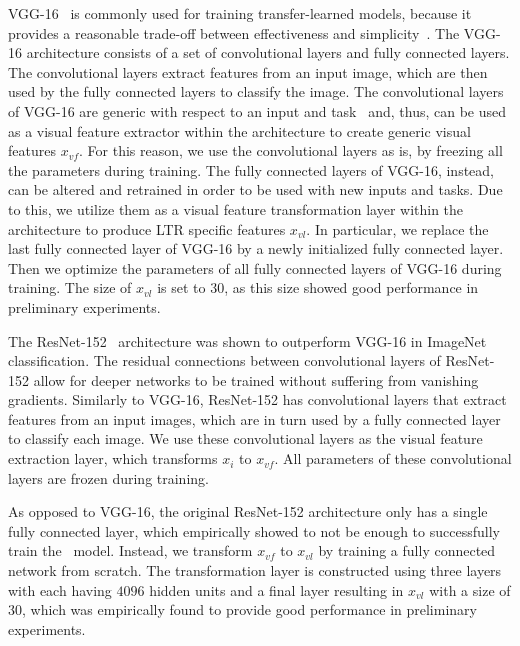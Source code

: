 VGG-16~\cite{simonyan2014very} is commonly used for training transfer-learned models,
because it provides a reasonable trade-off between effectiveness and simplicity~\cite{shan2017two}.
The VGG-16 architecture consists of a set of convolutional layers and fully connected layers. 
The convolutional layers extract features from an input image, which are then used by the fully connected layers to classify the image. 
The convolutional layers of VGG-16 are generic with respect to an input and task~\citep{donahue2014decaf}
and, thus, can be used as a visual feature extractor within the \modelname{} architecture to create generic visual features $x_{vf}$.
For this reason, we use the convolutional layers as is, by freezing all the parameters during training.
The fully connected layers of VGG-16, instead, can be altered and retrained in order to be used with new inputs and tasks.
Due to this, we utilize them as a visual feature transformation layer within the \modelname{} architecture to produce \ac{LTR} specific features $x_{vl}$.
In particular, we replace the last fully connected layer of VGG-16 by a newly initialized fully connected layer.
Then we optimize the parameters of all fully connected layers of VGG-16 during training.
The size of $x_{vl}$ is set to $30$, as this size showed good performance in preliminary experiments.

The ResNet-152~\cite{he2016deep} architecture was shown to outperform VGG-16 in ImageNet classification.
The residual connections between convolutional layers of ResNet-152 allow for deeper networks to be trained without suffering from vanishing gradients.
Similarly to VGG-16, ResNet-152 has convolutional layers that extract features from an input images, which are in turn used by a fully connected layer to classify each image.
We use these convolutional layers as the visual feature extraction layer, which transforms $x_{i}$ to $x_{vf}$. All parameters of these convolutional layers are frozen during training.

As opposed to VGG-16, the original ResNet-152 architecture only has a single fully connected layer, which empirically showed to not be enough to successfully train the \modelname~model.
Instead, we transform $x_{vf}$ to $x_{vl}$ by training a fully connected network from scratch.
The transformation layer is constructed using three layers with each having $4096$ hidden units and a final layer resulting in $x_{vl}$ with a size of $30$, which was empirically found to provide good performance in preliminary experiments.


